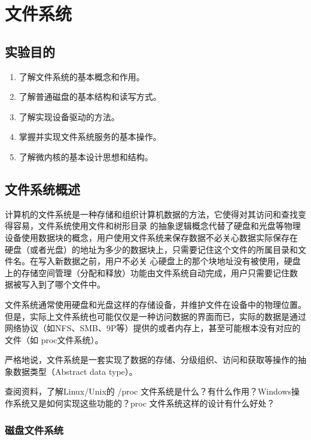 \chapter{文件系统}

\section{实验目的}
  \begin{enumerate}
    \item 了解文件系统的基本概念和作用。
    \item 了解普通磁盘的基本结构和读写方式。
    \item 了解实现设备驱动的方法。
    \item 掌握并实现文件系统服务的基本操作。
    \item 了解微内核的基本设计思想和结构。
  \end{enumerate}

\section{文件系统概述}

计算机的文件系统是一种存储和组织计算机数据的方法，它使得对其访问和查找变得容易，文件系统使用文件和树形目录
的抽象逻辑概念代替了硬盘和光盘等物理设备使用数据块的概念，用户使用文件系统来保存数据不必关心数据实际保存在
硬盘（或者光盘）的地址为多少的数据块上，只需要记住这个文件的所属目录和文件名。在写入新数据之前，用户不必关
心硬盘上的那个块地址没有被使用，硬盘上的存储空间管理（分配和释放）功能由文件系统自动完成，用户只需要记住数
据被写入到了哪个文件中。

文件系统通常使用硬盘和光盘这样的存储设备，并维护文件在设备中的物理位置。但是，实际上文件系统也可能仅仅是一种访问数据的界面而已，实际的数据是通过网络协议（如NFS、SMB、9P等）提供的或者内存上，甚至可能根本没有对应的文件（如 proc文件系统）。

严格地说，文件系统是一套实现了数据的存储、分级组织、访问和获取等操作的抽象数据类型（Abstract data type）。

\begin{thinking}\label{think-proc}
查阅资料，了解Linux/Unix的 /proc 文件系统是什么？有什么作用？Windows操作系统又是如何实现这些功能的？proc
文件系统这样的设计有什么好处？
\end{thinking}

\subsection{磁盘文件系统}

